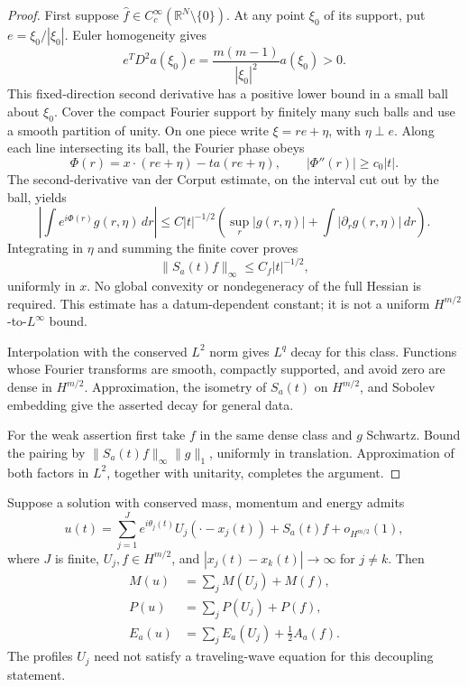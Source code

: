 \begin{proof}
First suppose $\widehat f\in C_c^\infty(\mathbb R^N\setminus\{0\})$. At any point $\xi_0$ of its support, put $e=\xi_0/|\xi_0|$. Euler homogeneity gives
\[
 e^T D^2a(\xi_0)e=\frac{m(m-1)}{|\xi_0|^2}a(\xi_0)>0.
\]
This fixed-direction second derivative has a positive lower bound in a small ball about $\xi_0$. Cover the compact Fourier support by finitely many such balls and use a smooth partition of unity. On one piece write $\xi=re+\eta$, with $\eta\perp e$. Along each line intersecting its ball, the Fourier phase obeys
\[
 \Phi(r)=x\cdot(re+\eta)-t a(re+\eta),\qquad
 |\Phi''(r)|\ge c_0|t|.
\]
The second-derivative van der Corput estimate, on the interval cut out by the ball, yields
\[
 \left|\int e^{i\Phi(r)}g(r,\eta)\,dr\right|
 \le C|t|^{-1/2}
 \left(\sup_r|g(r,\eta)|+\int|\partial_rg(r,\eta)|\,dr\right).
\]
Integrating in $\eta$ and summing the finite cover proves
\[
 \|S_a(t)f\|_\infty\le C_f|t|^{-1/2},
\]
uniformly in $x$. No global convexity or nondegeneracy of the full Hessian is required. This estimate has a datum-dependent constant; it is not a uniform $H^{m/2}$-to-$L^\infty$ bound.

Interpolation with the conserved $L^2$ norm gives $L^q$ decay for this class. Functions whose Fourier transforms are smooth, compactly supported, and avoid zero are dense in $H^{m/2}$. Approximation, the isometry of $S_a(t)$ on $H^{m/2}$, and Sobolev embedding give the asserted decay for general data.

For the weak assertion first take $f$ in the same dense class and $g$ Schwartz. Bound the pairing by $\|S_a(t)f\|_\infty\|g\|_1$, uniformly in translation. Approximation of both factors in $L^2$, together with unitarity, completes the argument.
\end{proof}

\begin{theorem}\label{thm:r8-decoupling}
Suppose a solution with conserved mass, momentum and energy admits
\[
 u(t)=\sum_{j=1}^{J}e^{i\theta_j(t)}U_j(\cdot-x_j(t))
       +S_a(t)f+o_{H^{m/2}}(1),
\]
where $J$ is finite, $U_j,f\in H^{m/2}$, and
$|x_j(t)-x_k(t)|\to\infty$ for $j\ne k$. Then
\begin{align*}
 M(u)&=\sum_jM(U_j)+M(f),\\
 P(u)&=\sum_jP(U_j)+P(f),\\
 E_a(u)&=\sum_jE_a(U_j)+\frac12A_a(f).
\end{align*}
The profiles $U_j$ need not satisfy a traveling-wave equation for this decoupling statement.
\end{theorem}

